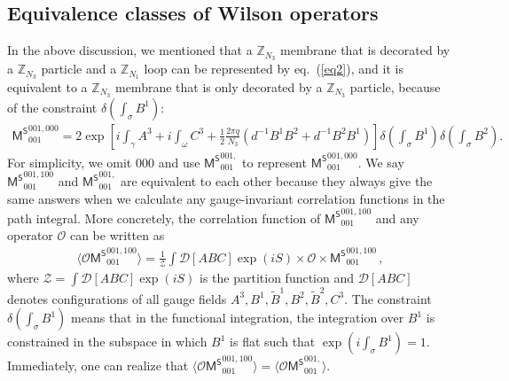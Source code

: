 \documentclass[11pt,nofootinbib,preprint]{revtex4-1}
\begin{document}
\subsection{Equivalence classes of Wilson operators\label{ss23}}
In the above discussion, we mentioned that a   $\mathbb{Z} _{N_3}$ membrane that is decorated by a $\mathbb{Z} _{N_3}$ particle and a $\mathbb{Z} _{N_1}$ loop can be represented by eq.~(\ref{eq2}), and it is equivalent to a   $\mathbb{Z} _{N_3}$ membrane  that is only decorated by a $\mathbb{Z} _{N_3}$ particle,  because of the constraint $\delta \left( \int_{\sigma}{B^1} \right)$: 
\begin{multline}
\!\!	\!\!\!\!\mathsf{M^S}_{001}^{001,000}\!\!=\!\!2\exp \left[ i\int_{\gamma}{A^3}+i\int_{\omega}{C^3+\frac{1}{2}\frac{2\pi q}{N_3}\!\left( d^{-1}B^1B^2\!+\!d^{-1}B^2B^1 \right)} \right] \!\!\delta \left( \int_{\sigma}{B^1} \right) \!\!\delta \left( \int_{\sigma}{B^2} \right) .\!\!
\end{multline}
For simplicity, we omit $000$ and use $\mathsf{M^S}_{001}^{001,}$ to represent $\mathsf{M^S}_{001}^{001,000}$. We say $\mathsf{M^S}_{001}^{001,100}$ and $\mathsf{M^S}_{001}^{001,}$ are equivalent to each other because they always give the same answers when we calculate any gauge-invariant correlation functions in the path integral. More concretely, the correlation function of $\mathsf{M^S}_{001}^{001,100}$ and any operator $\mathcal{O}$ can be written as
\begin{align}
	\langle \mathcal{O} \mathsf{M^S}_{001}^{001,100} \rangle =\frac{1}{\mathcal{Z}}\int\mathcal{D} \left[ ABC \right] \exp \left( iS \right) \times \mathcal{O} \times \mathsf{M^S}_{001}^{001,100}\,,
\end{align}
where $\mathcal{Z} =\int\mathcal{D} \left[ABC\right] \exp \left( iS \right) $ is the partition function and $\mathcal{D}[ABC]$ denotes   configurations of all gauge fields $A^3,B^1,\tilde{B}^1,B^2,\tilde{B}^2,C^3$. The constraint $\delta \left( \int_{\sigma}{B^1} \right) $ means that in the functional integration, the integration over $B^1$ is constrained in the subspace in which $B^1$ is flat such that $\exp \left( i\int_{\sigma}{{B}^1} \right)=1 $. Immediately, one can realize that $\langle \mathcal{O} \mathsf{M^S}_{001}^{001,100} \rangle=\langle \mathcal{O} \mathsf{M^S}_{001}^{001,} \rangle$. 
\end{document}
